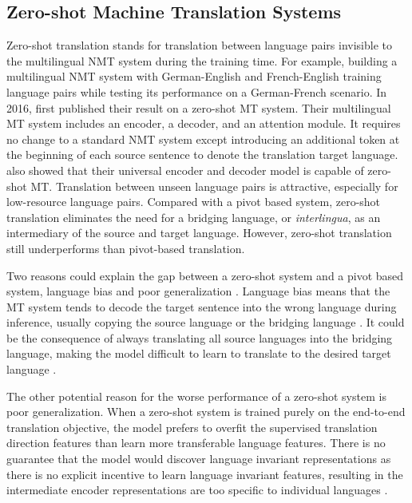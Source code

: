\documentclass[thesis,fonts=libertine]{cluu}
\begin{document}
\subsection{Zero-shot Machine Translation Systems}
\label{sec:zero_shot_mt}

Zero-shot translation stands for translation between language pairs invisible to the multilingual NMT system during the training time. For example, building a multilingual NMT system with German-English and French-English training language pairs while testing its performance on a German-French scenario. In 2016, \textcite{Johnson:2016aa} first published their result on a zero-shot MT system. Their multilingual MT system includes an encoder, a decoder, and an attention module. It requires no change to a standard NMT system except introducing an additional token at the beginning of each source sentence to denote the translation target language. \textcite{Ha:2016aa} also showed that their universal encoder and decoder model is capable of zero-shot MT. Translation between unseen language pairs is attractive, especially for low-resource language pairs. Compared with a pivot based system, zero-shot translation eliminates the need for a bridging language, or \textit{interlingua}, as an intermediary of the source and target language. However, zero-shot translation still underperforms than pivot-based translation.

Two reasons could explain the gap between a zero-shot system and a pivot based system, language bias \parencite{Ha:2016aa, Ha:2017aa, Arivazhagan:2019aa} and poor generalization \parencite{Arivazhagan:2019aa}. Language bias means that the MT system tends to decode the target sentence into the wrong language during inference, usually copying the source language or the bridging language \textcite{Ha:2016aa}. It could be the consequence of always translating all source languages into the bridging language, making the model difficult to learn to translate to the desired target language \parencite{Arivazhagan:2019aa}.

The other potential reason for the worse performance of a zero-shot system is poor generalization. When a zero-shot system is trained purely on the end-to-end translation objective, the model prefers to overfit the supervised translation direction features than learn more transferable language features. There is no guarantee that the model would discover language invariant representations as there is no explicit incentive to learn language invariant features, resulting in the intermediate encoder representations are too specific to individual languages \parencite{Arivazhagan:2019aa}.
\end{document}
